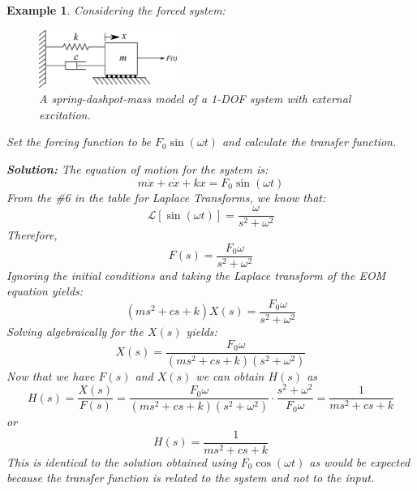 \documentclass[12pt,letter]{article}
\newtheorem{ex}{Example}
\numberwithin{ex}{section} %
\newenvironment{example}{\begin{mdframed}[middlelinewidth=0.5mm]\begin{ex}\normalfont}{\end{ex}\end{mdframed}}
\numberwithin{re}{section} %
\newcommand{\Laplace}[1]{\ensuremath{\mathcal{L}{\left[#1\right]}}}
\begin{document}
\begin{example}
	Considering the forced system:
	\begin{figure}[H]
		\centering
		\includegraphics[width=0.4\textwidth]{../figures/forced_spring_mass_damper_system.png}
		\caption{A spring-dashpot-mass model of a 1-DOF system with external excitation.}
	\end{figure}
	Set the forcing function to be $F_0 \sin(\omega t)$ and calculate the transfer function. 
	
	\noindent\textbf{Solution:} The equation of motion for the system is:
	\begin{equation}
		m\ddot{x} + c\dot{x} +kx = F_0 \sin(\omega t)
	\end{equation}
	From the \#6 in the table for Laplace Transforms, we know that:
	\begin{equation}
		\Laplace{\sin(\omega t)} = \frac{\omega}{s^2+\omega^2}
	\end{equation}
	Therefore, 
	\begin{equation}
	F(s) = \frac{F_0\omega}{s^2+\omega^2}
	\end{equation}
	Ignoring the initial conditions and taking the Laplace transform of the EOM equation yields:
	\begin{equation}
	(ms^2 + cs +k)X(s) = \frac{F_0 \omega}{s^2+\omega^2} 
	\end{equation}
	Solving algebraically for the $X(s)$ yields: 
	\begin{equation}
	X(s) = \frac{F_0\omega}{(ms^2 + cs +k)(s^2+\omega^2)}
	\end{equation}
	Now that we have $F(s)$ and $X(s)$ we can obtain $H(s)$ as  
	\begin{equation}
	H(s) = \frac{X(s)}{F(s)} = \frac{F_0 \omega }{(ms^2 + cs +k)(s^2+\omega^2)} \cdot \frac{s^2+\omega^2}{F_0 \omega} = \frac{1}{ms^2+cs+k}
	\end{equation}
	or 
	\begin{equation}
	H(s) = \frac{1}{ms^2+cs+k}
	\end{equation}
	This is identical to the solution obtained using $F_0 \cos(\omega t)$ as would be expected because the transfer function is related to the system and not to the input. 
\end{example}  
\end{document}

